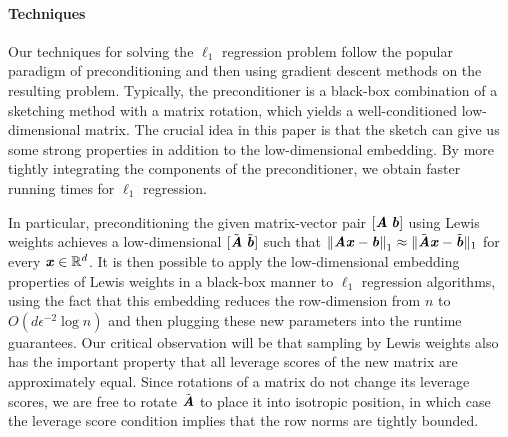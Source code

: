 \paragraph{Techniques} \label{subsec:results}

Our techniques for solving the $\ell_1$ regression problem follow the popular paradigm of preconditioning and then using gradient descent methods on the resulting problem. Typically, the preconditioner is a black-box combination of a sketching method with a matrix rotation, which yields a well-conditioned low-dimensional matrix. The crucial idea in this paper is that the sketch can give us some strong properties in addition to the low-dimensional embedding. By more tightly integrating the components of the preconditioner, we obtain faster running times for $\ell_1$ regression.


In particular, preconditioning the given matrix-vector pair $[\AA\;\bb]$ using Lewis weights \citep{cohenpeng}
achieves a low-dimensional $[\tilde{\AA}\;\tilde{\bb}]$ such that
$\norm{\AA \xx - \bb}_1 \approx \|\tilde{\AA} \xx - \tilde{\bb}\|_1$
for every $\xx \in \mathbb{R}^{d}$. 
It is then possible to apply the low-dimensional embedding properties of Lewis weights in a black-box manner to $\ell_1$ regression algorithms, using the fact that this embedding reduces the row-dimension from $n$ to $O(d \epsilon^{-2}\log n)$ and then plugging these new parameters into the runtime guarantees.
Our critical observation will be that sampling by Lewis weights also has the important property that all leverage scores of the new matrix are approximately equal.
Since rotations of a matrix do not change its leverage scores, we are free to rotate $\tilde{\AA}$ to place it into isotropic position, in which case the leverage score condition implies that the row norms are tightly bounded.


